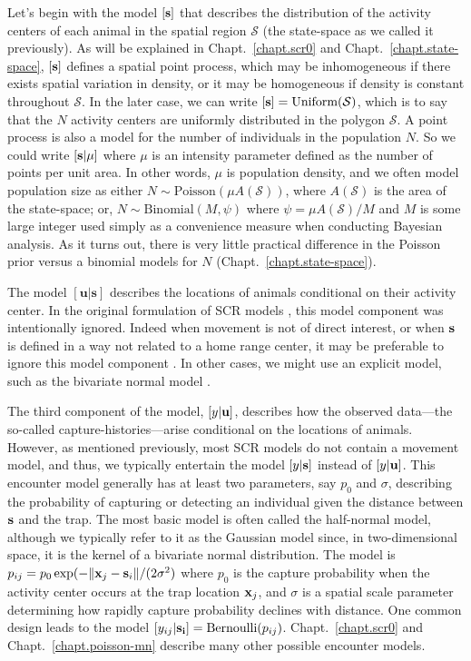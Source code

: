 Let's begin with the model $[{\bf s}]$ that describes the
distribution of the activity centers of each animal in the
spatial region $\mathcal{S}$ (the state-space as we called it previously).
As will be explained in Chapt.~\ref{chapt.scr0} and
Chapt.~\ref{chapt.state-space}, $[{\bf s}]$ defines  a spatial point process, which may be
inhomogeneous if there exists spatial variation in density, or it may
be homogeneous if density is constant throughout $\mathcal{S}$. In the
later case, we can write $[{\bf s}] = \text{Uniform}(\mathcal{S})$, which
is to say that the $N$ activity centers are uniformly distributed in
the polygon $\mathcal{S}$. A point process is also a model for the
number of individuals in the population $N$. So
we could write $[{\bf s}|\mu]$ where $\mu$ is an intensity
parameter defined as the number of points per unit area. In other
words, $\mu$ is population density, and we often model population size
as either $N \sim \text{Poisson}(\mu A(\mathcal{S}))$, where
$A(\mathcal{S})$ is the area of the state-space; or,
$N \sim \text{Binomial}(M, \psi)$ where $\psi = \mu A(\mathcal{S}) / M$ and
$M$ is some large integer used simply as a convenience measure when
conducting Bayesian analysis. As it turns out, there is very little
practical difference in the Poisson prior versus a binomial models for
$N$ (Chapt.~\ref{chapt.state-space}).

The model $[\mathbf{u}|\mathbf{s}]$ describes the locations of
animals conditional on their activity center. In the original
formulation of SCR models \citep{efford:2004}, this model component
was intentionally ignored. Indeed when movement is not of direct
interest, or when $\bf s$ is defined in a way not related to a home
range center, it may be preferable to ignore this model component
\citep{borchers:2011}. In other cases, we might use an explicit model,
such as the bivariate normal model \citep{royle_young:2008}.

The third component of the model, $[y|{\bf u}]$, describes how the
observed data---the so-called capture-histories---arise conditional on
the locations of animals. However, as mentioned previously, most SCR
models do not contain a movement model, and thus, we typically entertain
the model $[y|{\bf s}]$ instead of $[y|{\bf u}]$.
This encounter model
generally has at least two parameters, say $p_0$ and $\sigma$, describing the probability of
capturing or detecting an individual given the distance between $\bf
s$ and the trap. The most basic model is
often called the half-normal model, although we typically refer to it as the
Gaussian model since, in two-dimensional space, it is the kernel of a
bivariate normal distribution. The model is
$p_{ij} = p_0\exp(-\|{\bf x}_j - {\bf s}_i\| / (2\sigma^2)$ where
$p_0$ is the capture probability when the activity center occurs at
the trap location ${\bf x}_j$, and $\sigma$ is a spatial scale
parameter determining how rapidly capture probability declines with
distance. One common design leads to the model
$[y_{ij}|{\bf s_i}] =  \text{Bernoulli}(p_{ij})$. Chapt.~\ref{chapt.scr0} and
Chapt.~\ref{chapt.poisson-mn} describe many other possible encounter models.

